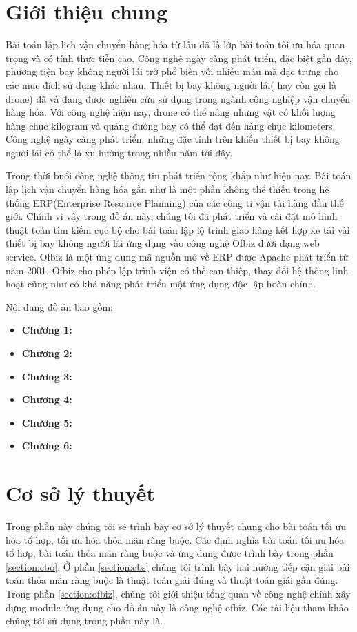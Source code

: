 \documentclass[a4paper,12pt]{report}
\begin{document}
{}
\chapter*{Giới thiệu chung}
Bài toán lập lịch vận chuyển hàng hóa từ lâu đã là lớp bài toán tối ưu hóa quan trọng và có tính thực tiễn cao. Công nghệ ngày càng phát triển, đặc biệt gần đây, phương tiện bay không người lái trở phổ biến với nhiều mẫu mã đặc trưng cho các mục đích sử dụng khác nhau. Thiết bị bay không người lái( hay còn gọi là drone) đã và đang được nghiên cứu sử dụng trong ngành công nghiệp vận chuyển hàng hóa. Với công nghệ hiện nay, drone có thể nâng những vật có khối lượng hàng chục kilogram và quảng đường bay có thể đạt đến hàng chục kilometers. Công nghệ ngày càng phát triển, những đặc tính trên khiến thiết bị bay không người lái có thể là xu hướng trong nhiều năm tới đây.

Trong thời buổi công nghệ thông tin phát triển rộng khắp như hiện nay. Bài toán lập lịch vận chuyển hàng hóa gần như là một phần không thể thiếu trong hệ thống \ac{ERP}(Enterprise Resource Planning) của các công ti vận tải hàng đầu thế giới. Chính vì vậy trong đồ án này, chúng tôi đã phát triển và cài đặt mô hình thuật toán tìm kiếm cục bộ cho bài toán lập lộ trình giao hàng kết hợp xe tải vài thiết bị bay không người lái ứng dụng vào công nghệ Ofbiz dưới dạng web service. Ofbiz là một ứng dụng mã nguồn mở về \ac{ERP} được Apache phát triển từ năm 2001. Ofbiz cho phép lập trình viện có thể can thiệp, thay đổi hệ thống linh hoạt cũng như có khả năng phát triển một ứng dụng độc lập hoàn chỉnh. 

Nội dung đồ án bao gồm:
\begin{itemize}
\item \textbf{Chương 1:}
\item \textbf{Chương 2:}
\item \textbf{Chương 3:}
\item \textbf{Chương 4:}
\item \textbf{Chương 5:}
\item \textbf{Chương 6:}
\end{itemize}

\chapter{Cơ sở lý thuyết}
Trong phần này chúng tôi sẽ trình bày cơ sở lý thuyết chung cho bài toán tối ưu hóa tổ hợp, tối ưu hóa thỏa mãn ràng buộc. Các định nghĩa bài toán tối ưu hóa tổ hợp, bài toán thỏa mãn ràng buộc và ứng dụng được trình bày trong phần \ref{section:cbo}. Ở phần \ref{section:cbs} chúng tôi trình bày hai hướng tiếp cận giải bài toán thỏa mãn ràng buộc là thuật toán giải đúng và thuật toán giải gần đúng. Trong phần \ref{section:ofbiz}, chúng tôi giới thiệu tổng quan về công nghệ chính xây dựng module ứng dụng cho đồ án này là công nghệ ofbiz. Các tài liệu tham khảo chúng tôi sử dụng trong phần này là\cite{TRR}.
\end{document}
